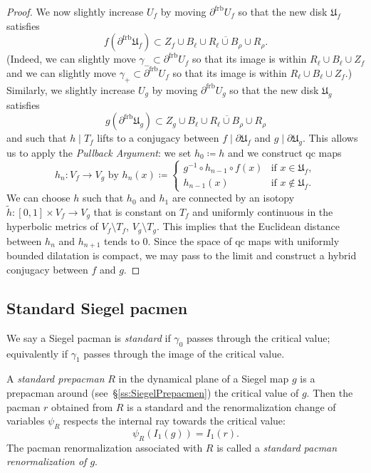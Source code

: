 \documentclass[]{amsart}
\newcommand\frb{{\operatorname{frb}}}
\theoremstyle{remark}
\numberwithin{equation}{section}
\theoremstyle{definition}
\begin{document}
\begin{proof}
We now slightly increase $U_f $ by moving $\partial^\frb U_f$ so that the new disk $\mathfrak U_f$ satisfies \[f(\partial^\frb \mathfrak U_f)\subset Z_f \cup \overline {B_\ell\cup R_\ell \cup B_\rho \cup R_\rho}.\]
(Indeed, we can slightly move $\gamma_-\subset \partial^\frb U_f$ so that its image is within $R_\ell\cup B_\ell\cup Z_f$ and we can slightly move $\gamma_+\subset \partial^\frb U_f$ so that its image is within $R_\ell\cup B_\ell\cup Z_f$.) 
Similarly, we slightly increase $U_g$ by moving $\partial^\frb U_g$ so that the new disk $\mathfrak U_g$ satisfies \[g(\partial^\frb \mathfrak U_g)\subset Z_g \cup \overline {B_\ell\cup R_\ell \cup B_\rho \cup R_\rho}\] and such that $h\mid T_f$ lifts to a conjugacy between $f \mid \partial \mathfrak U_f$ and $g \mid \partial \mathfrak U_g$. This allows us to apply the \emph{Pullback Argument}: we set $h_0\coloneqq h$ and we construct qc maps 
\[ h_n:V_f\to V_g \mbox{ by }h_n(x)\coloneqq \begin{cases} g^{-1}\circ h_{n-1}\circ f(x) &\mbox{if } x\in \mathfrak  U_f,\\
  h_{n-1} (x) &\mbox{if } x\notin  \mathfrak  U_f.
  \end{cases} \]
  We can choose $h$ such that $h_0$ and $h_1$ are connected by an isotopy $\tilde h\colon [0,1]\times V_f\to V_g$ that is constant on $T_f$ and uniformly continuous in the hyperbolic metrics of $V_f\setminus T_f$, $V_g\setminus T_g$. This implies that the Euclidean distance between $h_n$ and $h_{n+1}$ tends to $0$. Since the space of qc maps with uniformly bounded dilatation is compact, we may pass to the limit and construct a hybrid conjugacy between $f$ and $g$.
\end{proof}


\subsection{Standard Siegel pacmen}
\label{ss:StandardPacmen}
We say a Siegel pacman is \emph{standard} if $\gamma_0$ passes through the critical value; equivalently if $\gamma_1$ passes through the image of the critical value.

  A \emph{standard prepacman} $R$ in the dynamical plane of a Siegel map $g$ is a prepacman around (see~\S\ref{ss:SiegelPrepacmen}) the critical value of $g$. Then the pacman $r$ obtained from $R$ is a standard and the renormalization  change of variables $\psi_R$ respects the internal ray towards the critical value: 
  \begin{equation}
  \label{eq:I_1 is respect}
  \psi_R(I_1(g))=I_1(r).
  \end{equation} The pacman renormalization associated with $R$ is called a \emph{standard pacman renormalization of $g$}.
\end{document}
